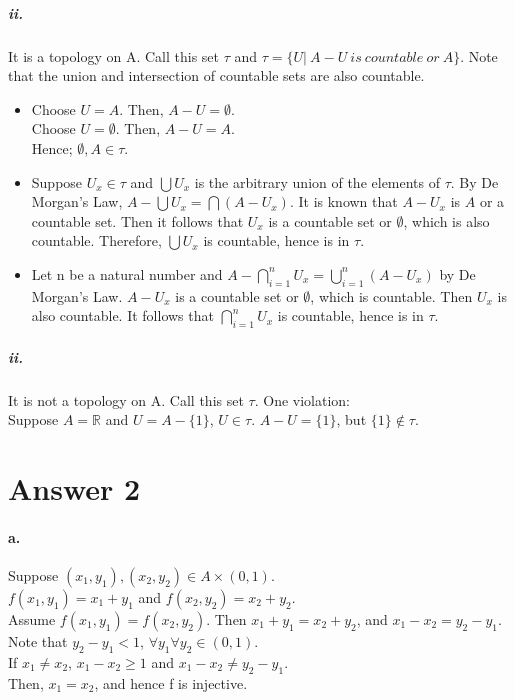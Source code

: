 \documentclass[11pt]{article}
\begin{document}
    \subparagraph{ii.}
    It is a topology on A. Call this set $\tau$ and $\tau = \{U | \ A-U \  is \ countable \ or \ A\}$. Note that the union and intersection of countable sets are also countable.
    \begin{itemize}
        \item Choose $U = A$. Then, $A-U = \emptyset$.\\
        Choose $U = \emptyset$. Then, $A-U = A$.\\
        Hence; $\emptyset , A \in \tau$.
        \item Suppose $U_x \in \tau$ and $\bigcup U_x$ is the arbitrary union of the elements of $\tau$. By De Morgan's Law, $A- \bigcup U_x = \bigcap (A-U_x)$. It is known that $A-U_x$ is $A$ or a countable set. Then it follows that $U_x$ is a countable set or $\emptyset$, which is also countable. Therefore, $\bigcup U_x$ is countable, hence is in $\tau$.
        \item Let n be a natural number and $A-\bigcap_{i=1}^n U_x = \bigcup_{i=1}^n(A-U_x)$ by De Morgan's Law. $A-U_x$ is a countable set or $\emptyset$, which is countable. Then $U_x$ is also countable. It follows that $\bigcap_{i=1}^n U_x$ is countable, hence is in $\tau$.
    \end{itemize}
    \subparagraph{ii.}
    It is not a topology on A. Call this set $\tau$. One violation:\\
    \-\hspace{33px} Suppose $A = \mathbb{R} $ and $U=A-\{1\}$, $U \in \tau$. $A-U = \{1\}$, but $\{1\} \notin \tau $. 
    
\section*{Answer 2}
\paragraph{a.}
    Suppose $(x_1, y_1),(x_2,y_2) \in A \times (0,1)$.\\
    $f(x_1,y_1)=x_1+y_1$ and $f(x_2,y_2)=x_2+y_2$.\\
    Assume $f(x_1,y_1) = f(x_2,y_2)$. Then $x_1+y_1 = x_2+y_2$, and $x_1-x_2 = y_2-y_1$.\\
    Note that $y_2-y_1<1$, $\forall y_1 \forall y_2 \in (0,1)$.\\
    If $x_1 \neq x_2$, $x_1-x_2 \geq 1$ and $x_1-x_2 \neq y_2-y_1$.\\
    Then, $x_1 = x_2$, and hence f is injective.
\end{document}
